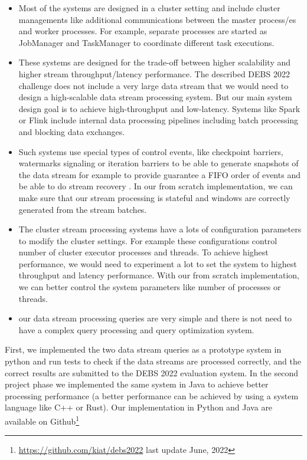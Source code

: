 \begin{itemize}
    \item Most of the systems are designed in a cluster setting and include cluster managements like additional communications between the master process/es and worker processes.
    For example, separate processes are started as JobManager and TaskManager to coordinate different task executions. 

    \item These systems are designed for the trade-off between higher scalability and higher stream throughput/latency performance. 
    The described DEBS 2022 challenge does not include a very large  data stream that we would need to design a high-scalable data stream processing system. But our main system design goal is to achieve 
    high-throughput and low-latency. Systems like Spark or Flink include internal data processing pipelines including batch processing and blocking data exchanges. 
    
    \item Such systems use special types of control events, like  checkpoint barriers,  watermarks signaling or iteration barriers to be able to generate snapshots of 
    the data stream for example to provide guarantee a FIFO order of events and be able to do stream recovery \cite{df177547a4364bb0a7e2470b83025bb0}. In our from scratch implementation, we can make sure that our stream processing 
    is stateful and windows are correctly generated from the stream batches.

    \item The cluster stream processing systems have a lots of configuration parameters to modify the cluster settings. For example these configurations control number of cluster executor processes and threads. To achieve highest performance, we would need 
    to experiment a lot to set the system to highest throughput and latency performance. With our from scratch implementation, we can better control the system parameters like number of processes or threads. 

    \item our data stream processing queries are very simple and there is not need to have a complex query processing and query optimization system. 

\end{itemize}



First, we implemented the two data stream queries as a prototype system in python and run tests to check if the data streams are processed correctly, and the correct
results are submitted to the DEBS 2022 evaluation system. In the second project phase we implemented the same system in Java to achieve better processing 
performance (a better performance can be achieved by using a system language like C++ or Rust).  
Our implementation in Python and Java are available on Github\footnote{\url{https://github.com/kiat/debs2022} last update June, 2022}



